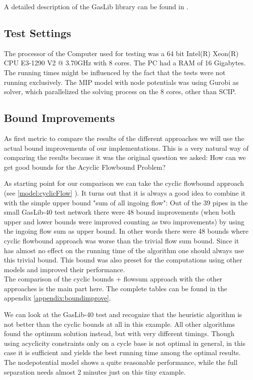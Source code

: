 A detailed description of the GasLib library can be found in 
\cite{HumpolaJoormannOucherifPfetschScheweSchmidtSchwarz:2015}.\\

\subsection{Test Settings}
The processor of the Computer used for testing was a 64 bit Intel(R) Xeon(R) CPU E3-1290 V2 @ 3.70GHz with 8 cores. The 
PC had a RAM of 16 Gigabytes. The running times might be influenced by the fact that the tests were not running 
exclusively. The MIP model with node potentials was using Gurobi as solver, which parallelized the solving process on 
the 8 cores, other than SCIP. 


\subsection{Bound Improvements}
As first metric to compare the results of the different approaches we will use the actual bound improvements of our 
implementations. This is a very natural way of comparing the results because it was the original question we asked: How 
can we get good bounds for the Acyclic Flowbound Problem? 

As starting point for our comparison we can take the cyclic flowbound approach (see \ref{model:cyclicFlow} ). It turns 
out that it is always a good idea to combine it with the simple upper bound "sum of all ingoing flow": Out of the 39 
pipes in the small GasLib-40 test network there were 48 bound improvements (when both upper and lower bounds were 
improved counting as two improvements) by using the ingoing flow sum as upper bound. In other words there were 48 
bounds where cyclic flowbound approach was worse than the trivial flow sum bound. 
Since it has almost no effect on the running time of the algorithm one should always use this trivial bound. This 
bound was also preset for the computations using other models and improved their performance.\\

The comparison of the cyclic bounds + flowsum approach with the other approaches is the main part here. The complete 
tables can be found in the appendix \ref{appendix:boundimprove}. 

We can look at the GasLib-40 test and recognize that the heuristic algorithm is not better than the cyclic bounds at 
all in this example. All other algorithms found the optimum solution instead, but with very different timings. Though 
using acyclicity constraints only on a cycle base is not optimal in general, in this case it is sufficient and yields 
the best running time among the optimal results. The nodepotential model shows a quite reasonable performance, while 
the full separation needs almost 2 minutes just on this tiny example.

